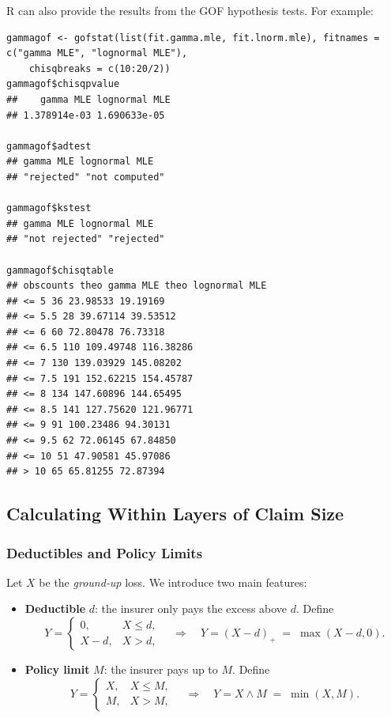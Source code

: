 \documentclass[11pt]{article}
\newcommand{\noi}{\noindent}
\begin{document}
\noi R can also provide the results from the GOF hypothesis tests. For example:
\begin{lstlisting}
gammagof <- gofstat(list(fit.gamma.mle, fit.lnorm.mle), fitnames = c("gamma MLE", "lognormal MLE"),
    chisqbreaks = c(10:20/2))
gammagof$chisqpvalue
##    gamma MLE lognormal MLE
## 1.378914e-03 1.690633e-05

gammagof$adtest
## gamma MLE lognormal MLE
## "rejected" "not computed"

gammagof$kstest
## gamma MLE lognormal MLE
## "not rejected" "rejected"

gammagof$chisqtable
## obscounts theo gamma MLE theo lognormal MLE
## <= 5 36 23.98533 19.19169
## <= 5.5 28 39.67114 39.53512
## <= 6 60 72.80478 76.73318
## <= 6.5 110 109.49748 116.38286
## <= 7 130 139.03929 145.08202
## <= 7.5 191 152.62215 154.45787
## <= 8 134 147.60896 144.65495
## <= 8.5 141 127.75620 121.96771
## <= 9 91 100.23486 94.30131
## <= 9.5 62 72.06145 67.84850
## <= 10 51 47.90581 45.97086
## > 10 65 65.81255 72.87394
\end{lstlisting}

\subsection{Calculating Within Layers of Claim Size}
\subsubsection{Deductibles and Policy Limits}

Let \(X\) be the \emph{ground‐up} loss.  We introduce two main features:

\begin{itemize}
  \item \textbf{Deductible} \(d\): the insurer only pays the excess above \(d\).  Define
  \[
    Y = 
    \begin{cases}
      0,             & X \le d,\\
      X - d,         & X > d,
    \end{cases}
    \quad\Longrightarrow\quad
    Y = (X - d)_{+} \;=\;\max(X - d,0).
  \]
  \item \textbf{Policy limit} \(M\): the insurer pays up to \(M\).  Define
  \[
    Y =
    \begin{cases}
      X,             & X \le M,\\
      M,             & X > M,
    \end{cases}
    \quad\Longrightarrow\quad
    Y = X \wedge M \;=\;\min(X,M).
  \]
\end{itemize}
\end{document}
